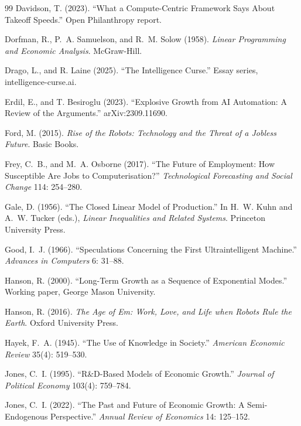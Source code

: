 \documentclass[11pt]{article}
\begin{document}
\begin{thebibliography}{99}
Davidson, T. (2023). ``What a Compute-Centric Framework Says About Takeoff Speeds.'' Open Philanthropy report.

Dorfman, R., P.~A. Samuelson, and R.~M. Solow (1958). \emph{Linear Programming and Economic Analysis}. McGraw-Hill.

Drago, L., and R. Laine (2025). ``The Intelligence Curse.'' Essay series, intelligence-curse.ai.

Erdil, E., and T. Besiroglu (2023). ``Explosive Growth from AI Automation: A Review of the Arguments.'' arXiv:2309.11690.

Ford, M. (2015). \emph{Rise of the Robots: Technology and the Threat of a Jobless Future}. Basic Books.

Frey, C.~B., and M.~A. Osborne (2017). ``The Future of Employment: How Susceptible Are Jobs to Computerisation?'' \emph{Technological Forecasting and Social Change} 114: 254--280.

Gale, D. (1956). ``The Closed Linear Model of Production.'' In H.~W. Kuhn and A.~W. Tucker (eds.), \emph{Linear Inequalities and Related Systems}. Princeton University Press.

Good, I.~J. (1966). ``Speculations Concerning the First Ultraintelligent Machine.'' \emph{Advances in Computers} 6: 31--88.

Hanson, R. (2000). ``Long-Term Growth as a Sequence of Exponential Modes.'' Working paper, George Mason University.

Hanson, R. (2016). \emph{The Age of Em: Work, Love, and Life when Robots Rule the Earth}. Oxford University Press.

Hayek, F.~A. (1945). ``The Use of Knowledge in Society.'' \emph{American Economic Review} 35(4): 519--530.

Jones, C.~I. (1995). ``R\&D-Based Models of Economic Growth.'' \emph{Journal of Political Economy} 103(4): 759--784.

Jones, C.~I. (2022). ``The Past and Future of Economic Growth: A Semi-Endogenous Perspective.'' \emph{Annual Review of Economics} 14: 125--152.


\end{thebibliography}
\end{document}
